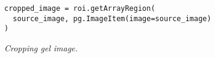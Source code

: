 



\begin{figure}[h]
    \begin{verbatim}
cropped_image = roi.getArrayRegion(
  source_image, pg.ImageItem(image=source_image)
)
    \end{verbatim}
    \caption{\textit{Cropping gel image.}}
    \label{fig:cropping-gel-image}
\end{figure}